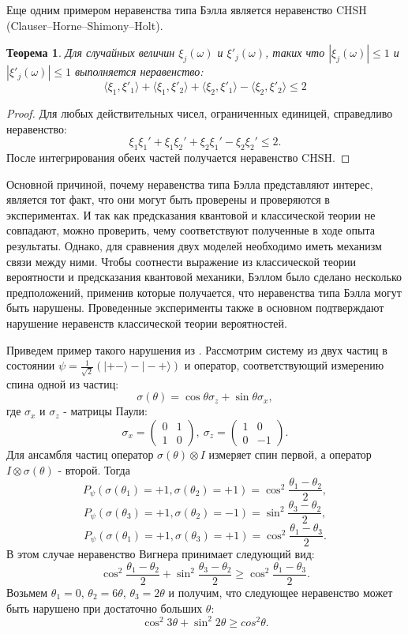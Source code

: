 \documentclass[%
master,         %
subf,           %
href,           %
,times         %
]{disser}
\numberwithin{equation}{section}
\numberwithin{figure}{section}
\newtheorem{theorem}{Теорема}[section]
\begin{document}
Еще одним примером неравенства типа Бэлла является неравенство CHSH
(Clauser–Horne–Shimony–Holt).
\begin{theorem}
Для случайных величин $\xi_j(\omega)$ и $\xi'_j(\omega)$, таких что $|\xi_j(\omega)| \leq 1$ и $|\xi'_j(\omega)| \leq 1$ выполняется неравенство:
\[
\langle\xi_1,\xi'_1\rangle + \langle\xi_1,\xi'_2\rangle + \langle\xi_2,\xi'_1\rangle -  \langle\xi_2,\xi'_2\rangle \leq 2
\]
\end{theorem}

\begin{proof}
Для любых действительных чисел, ограниченных единицей, справедливо неравенство:
\[
\xi_1\xi_1' + \xi_1\xi_2' + \xi_2\xi_1' - \xi_2\xi_2' \leq 2.
\]
После интегрирования обеих частей получается неравенство CHSH.
\end{proof}

Основной причиной, почему неравенства типа Бэлла представляют интерес, является тот факт, что они могут быть проверены и проверяются в экспериментах. И так как предсказания квантовой и классической теории не совпадают, можно проверить, чему соответствуют полученные в ходе опыта результаты. Однако, для сравнения двух моделей необходимо иметь механизм связи между ними. Чтобы соотнести выражение из классической теории вероятности и предсказания квантовой механики, Бэллом было сделано несколько предположений, применив которые получается, что неравенства типа Бэлла могут быть нарушены. Проведенные эксперименты также в основном подтверждают нарушение неравенств классической теории вероятностей.

Приведем пример такого нарушения из \cite{Khrennikov_information}. Рассмотрим систему из двух частиц в состоянии $\psi = \frac{1}{\sqrt{2}}(|+-\rangle - |-+\rangle)$ и оператор, соответствующий измерению спина одной из частиц:
\[
\sigma(\theta) = \cos\theta\sigma_z + \sin\theta\sigma_x,
\] 
где $\sigma_x$ и $\sigma_z$ - матрицы Паули:
\[
\sigma_x = 
\begin{pmatrix}
0 & 1\\
1 & 0
\end{pmatrix},\ \sigma_z = 
\begin{pmatrix}
1 & 0\\
0 & -1
\end{pmatrix}.
\]
Для ансамбля частиц оператор $\sigma(\theta) \otimes I$ измеряет спин первой, а оператор $I \otimes \sigma(\theta)$ - второй.
Тогда
\[
P_\psi(\sigma(\theta_1) = + 1, \sigma(\theta_2) = +1) = \cos^2\frac{\theta_1 - \theta_2}{2},
\]
\[
P_\psi(\sigma(\theta_3) = + 1, \sigma(\theta_2) = -1) = \sin^2\frac{\theta_3 - \theta_2}{2},
\]
\[
P_\psi(\sigma(\theta_1) = + 1, \sigma(\theta_3) = +1) = \cos^2\frac{\theta_1 - \theta_3}{2}.
\]
В этом случае неравенство Вигнера принимает следующий вид:
\[
\cos^2\frac{\theta_1 - \theta_2}{2} + \sin^2\frac{\theta_3 - \theta_2}{2} \geq  \cos^2\frac{\theta_1 - \theta_3}{2}.
\]
Возьмем $\theta_1 = 0$, $\theta_2 = 6\theta$, $\theta_3 = 2\theta$ и получим, что следующее неравенство может быть нарушено при достаточно больших $\theta$:
\[
\cos^2 3\theta + \sin^2 2\theta \geq cos^2 \theta.
\]
\end{document}
